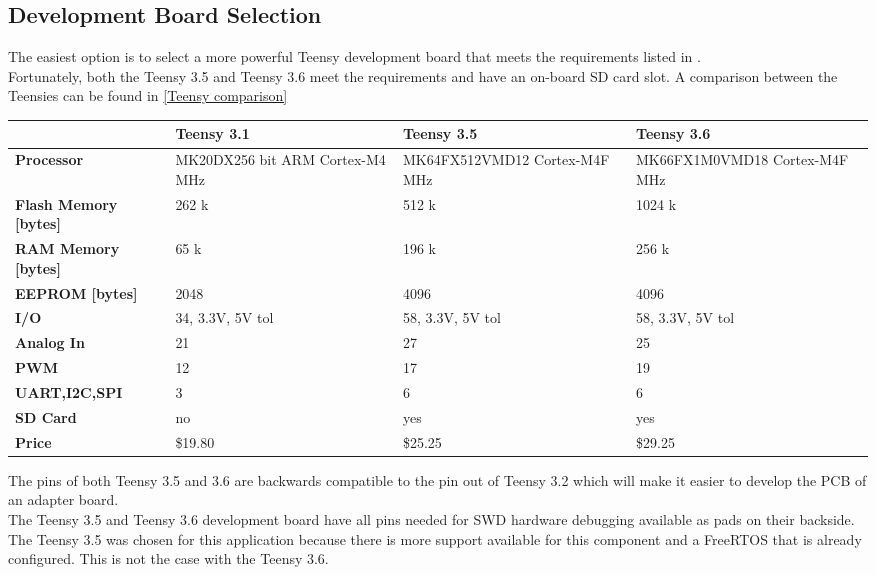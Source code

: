 \subsection{Development Board Selection}
The easiest option is to select a more powerful Teensy development board that meets the requirements listed in . \\
Fortunately, both the Teensy 3.5 and Teensy 3.6 meet the requirements and have an on-board SD card slot. A comparison between the Teensies can be found in \autoref{Teensy comparison}
%
\begin{table}[h]
    \begin{center}
        \begin{tabular}{l|L{4cm}L{4cm}L{4cm}}
             & \textbf{Teensy 3.1} & \textbf{Teensy 3.5} & \textbf{Teensy 3.6} \\
             \hline
            \textbf{Processor} & MK20DX256  bit ARM \newline Cortex-M4  MHz & 
            MK64FX512VMD12 \newline Cortex-M4F  MHz & 
            MK66FX1M0VMD18 \newline Cortex-M4F  MHz \\
            \textbf{Flash Memory [bytes]} & 262 k & 512 k & 1024 k \\
            \textbf{RAM Memory [bytes]} & 65 k & 196 k & 256 k \\
            \textbf{EEPROM [bytes]}	 & 2048 & 4096 & 4096 \\
            \textbf{I/O} & 34, 3.3V, 5V tol & 58, 3.3V, 5V tol & 58, 3.3V, 5V tol \\
            \textbf{Analog In} & 21 & 27 & 25 \\
            \textbf{PWM} & 12 & 17 & 19 \\
            \textbf{UART,I2C,SPI} & 3 & 6 & 6 \\
            \textbf{SD Card} & no & yes & yes \\
            \textbf{Price} & \$19.80 & \$25.25 & \$29.25 \\
        \end{tabular}
    \end{center}
    \label{Teensy comparison}
\end{table}
%
The pins of both Teensy 3.5 and 3.6 are backwards compatible to the pin out of Teensy 3.2 which will make it easier to develop the PCB of an adapter board. \\
The Teensy 3.5 and Teensy 3.6 development board have all pins needed for SWD hardware debugging available as pads on their backside. \\
The Teensy 3.5 was chosen for this application because there is more support available for this component and a FreeRTOS that is already configured. This is not the case with the Teensy 3.6.\\
%
%
